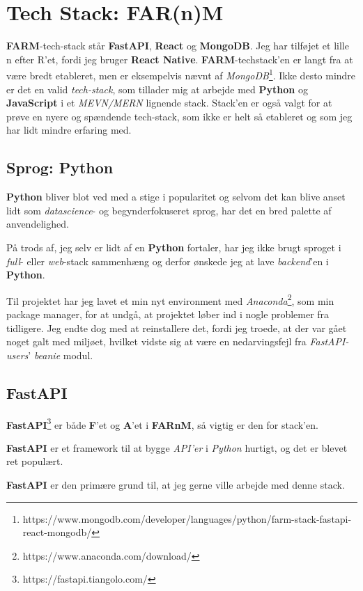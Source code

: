 \documentclass{report}
\begin{document}
\section{Tech Stack: FAR(n)M}
\textbf{FARM}-tech-stack står \textbf{FastAPI}, \textbf{React} og \textbf{MongoDB}. Jeg har tilføjet et lille n efter R’et, fordi jeg bruger \textbf{React Native}. \textbf{FARM}-techstack’en er langt fra at være bredt etableret, men er eksempelvis nævnt af \textit{MongoDB}\footnote{https://www.mongodb.com/developer/languages/python/farm-stack-fastapi-react-mongodb/}. 
Ikke desto mindre er det en valid \textit{tech-stack}, som tillader mig at arbejde med \textbf{Python} og \textbf{JavaScript} i et \textit{MEVN/MERN} lignende stack. Stack’en er også valgt for at prøve en nyere og spændende tech-stack, som ikke er helt så etableret og som jeg har lidt mindre erfaring med.

\subsection{Sprog: Python}
\textbf{Python} bliver blot ved med a stige i popularitet og selvom det kan blive anset lidt som \textit{datascience}- og begynderfokuseret sprog, har det en bred palette af anvendelighed.\par{}
På trods af, jeg selv er lidt af en \textbf{Python} fortaler, har jeg ikke brugt sproget i \textit{full}- eller \textit{web}-stack sammenhæng og derfor ønskede jeg at lave \textit{backend}’en i \textbf{Python}.\par{}
Til projektet har jeg lavet et min nyt environment med \textit{Anaconda}\footnote{https://www.anaconda.com/download/}, som min package manager, for at undgå, at projektet løber ind i nogle problemer fra tidligere. Jeg endte dog med at reinstallere det, fordi jeg troede, at der var gået noget galt med miljøet, hvilket vidste sig at være en nedarvingsfejl fra \textit{FastAPI-users}' \textit{beanie} modul.\par{}

\subsection{FastAPI}
\textbf{FastAPI}\footnote{https://fastapi.tiangolo.com/} er både \textbf{F}’et og \textbf{A}’et i \textbf{FARnM}, så vigtig er den for stack’en.\par{}
\textbf{FastAPI} er et framework til at bygge \textit{API’er} i \textit{Python} hurtigt, og det er blevet ret populært.\par{}
\textbf{FastAPI} er den primære grund til, at jeg gerne ville arbejde med denne stack.
\end{document}
